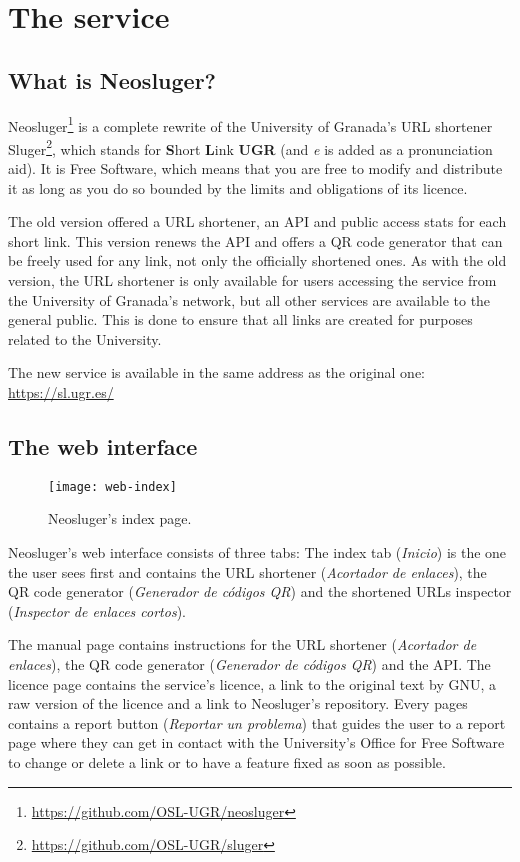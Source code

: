 \chapter{The service}\label{the-service}

\section{What is Neosluger?}\label{what-is-neosluger}

Neosluger\footnote{
	\url{https://github.com/OSL-UGR/neosluger}
} is a complete rewrite of the University of Granada's URL shortener Sluger\footnote{
	\url{https://github.com/OSL-UGR/sluger}
},
which stands for \textbf{S}hort \textbf{L}ink \textbf{UGR} (and \textit{e} is added as a pronunciation aid).
It is Free Software, which means that you are free to modify and distribute it as long as you do so bounded by the limits and obligations of its licence.

The old version offered a URL shortener, an API and public access stats for each short link.
This version renews the API and offers a QR code generator that can be freely used for any link, not only the officially shortened ones.
As with the old version, the URL shortener is only available for users accessing the service from the University of Granada's network, but all other services are available to the general public.
This is done to ensure that all links are created for purposes related to the University.

The new service is available in the same address as the original one: \url{https://sl.ugr.es/}

\section{The web interface}\label{the-web-interface}

\begin{figure}[ht!]
	\texttt{[image: web-index]}
	\caption{Neosluger's index page.}
\end{figure}

Neosluger's web interface consists of three tabs:
The index tab (\textit{Inicio}) is the one the user sees first and contains the URL shortener (\textit{Acortador de enlaces}), the QR code generator (\textit{Generador de códigos QR}) and the shortened URLs inspector (\textit{Inspector de enlaces cortos}).

The manual page contains instructions for the URL shortener (\textit{Acortador de enlaces}), the QR code generator (\textit{Generador de códigos QR}) and the API.
The licence page contains the service's licence, a link to the original text by GNU, a raw version of the licence and a link to Neosluger's repository.
Every pages contains a report button (\textit{Reportar un problema}) that guides the user to a report page where they can get in contact with the University's Office for Free Software to change or delete a link or to have a feature fixed as soon as possible.

